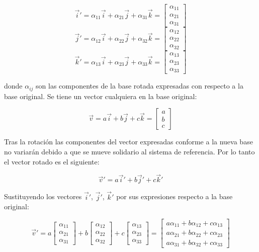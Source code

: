 \documentclass[12pt, a4paper]{report}
\begin{document}
$$ \vec{i}' = \alpha_{11}\vec{i} + \alpha_{21}\vec{j} + \alpha_{31}\vec{k} = \begin{bmatrix}  \alpha_{11}\\\alpha_{21}\\\alpha_{31} \end{bmatrix} $$
$$ \vec{j}' = \alpha_{12}\vec{i} + \alpha_{22}\vec{j} + \alpha_{32}\vec{k} = \begin{bmatrix} \alpha_{12}\\\alpha_{22}\\\alpha_{32} \end{bmatrix} $$
$$ \vec{k}' = \alpha_{13}\vec{i} + \alpha_{23}\vec{j} + \alpha_{33}\vec{k} = \begin{bmatrix} \alpha_{13}\\\alpha_{23}\\\alpha_{33} \end{bmatrix} $$

donde $\alpha_{ij}$ son las componentes de la base rotada expresadas con respecto a la base original. Se tiene un vector cualquiera en la base original:

$$ \vec{v} = a\vec{i} + b\vec{j} + c\vec{k} = \begin{bmatrix} a\\b\\c \end{bmatrix} $$

Tras la rotación las componentes del vector expresadas conforme a la nueva base no variarán debido a que se mueve solidario al sistema de referencia. Por lo tanto el vector rotado es el siguiente:

$$ \vec{v}' = a\vec{i}' + b\vec{j}' + c\vec{k}' $$

Sustituyendo los vectores $\vec{i}'$, $\vec{j}'$, $\vec{k}'$ por sus expresiones respecto a la base original:

$$ \vec{v}' = a \begin{bmatrix}  \alpha_{11}\\\alpha_{21}\\\alpha_{31} \end{bmatrix} + b \begin{bmatrix}  \alpha_{12}\\\alpha_{22}\\\alpha_{32} \end{bmatrix}  + c \begin{bmatrix}  \alpha_{13}\\\alpha_{23}\\\alpha_{33} \end{bmatrix} = \begin{bmatrix}  a\alpha_{11} + b\alpha_{12} + c\alpha_{13} \\ a\alpha_{21} + b\alpha_{22} + c\alpha_{23}\\ a\alpha_{31} + b\alpha_{32} + c\alpha_{33} \end{bmatrix} $$
\end{document}
